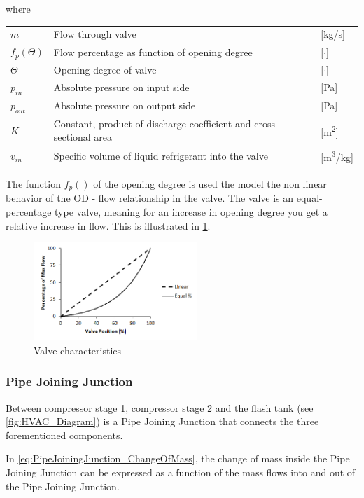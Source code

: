 where
\begin{center}
	\begin{tabular}{l p{8cm} l}
		$\dot{m}$	& Flow through valve & [\si{kg}/\si{s}]\\
		$f_p(\Theta)$ & Flow percentage as function of opening degree & [$\cdot$] \\
		$ \Theta $ & Opening degree of valve& [$ \cdot $]\\
		$p_{in}$ 	& Absolute pressure on input side & [\si{Pa}]\\
		$p_{out}$ 	& Absolute pressure on output side & [\si{Pa}]\\
		$K$ 		& Constant, product of discharge coefficient and cross sectional area & [\si{m^2}]\\
		$v_{in}$ 	& Specific volume of liquid refrigerant into the valve & [\si{m^3}/\si{kg}]

	\end{tabular}
\end{center}

The function $f_p()$ of the opening degree is used the model the non linear behavior of the OD - flow relationship in the valve. The valve is an equal-percentage type valve, meaning for an increase in opening degree you get a relative increase in flow. This is illustrated in \cref{fig:equal_percent_valve}.

\begin{figure}[h!]
	\centering
	\includegraphics[width=0.55\textwidth]{Graphics/Equal-percentage.png}
	\caption{Valve characteristics}
	\label{fig:equal_percent_valve}
\end{figure}


\subsubsection{Pipe Joining Junction}
Between compressor stage 1, compressor stage 2 and the flash tank (see \cref{fig:HVAC_Diagram}) is a Pipe Joining Junction that connects the three forementioned components.

In \cref{eq:PipeJoiningJunction_ChangeOfMass}, the change of mass inside the Pipe Joining Junction can be expressed as a function of the mass flows into and out of the Pipe Joining Junction.

